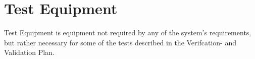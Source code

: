 \section{Test Equipment}

Test Equipment is equipment not required by any of the system's requirements, but rather necessary for some of the tests described in the Verifcation- and Validation Plan.